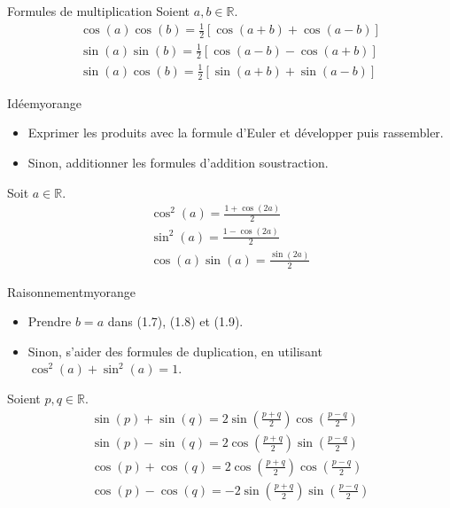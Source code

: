     \begin{coro}{Formules de multiplication}{}
        Soient $a,b \in \mathbb{R}$.
        \begin{align}
            \cos(a)\cos(b) = \frac{1}{2} \left[ \cos(a+b) + \cos(a-b) \right] \\
            \sin(a)\sin(b) = \frac{1}{2} \left[ \cos(a-b) - \cos(a+b) \right] \\
            \sin(a)\cos(b) = \frac{1}{2} \left[ \sin(a+b) + \sin(a-b) \right]
        \end{align}
    \end{coro}

    \begin{demo}{Idée}{myorange}
        \begin{itemize}[label=\textcolor{myorange}{$\star$}]
            \item Exprimer les produits avec la formule d’Euler et développer puis rassembler.
            \item Sinon, additionner les formules d’addition soustraction.
        \end{itemize}
    \end{demo}

    \begin{coro}{}{}
        Soit $a \in \mathbb{R}$.
        \begin{align}
            \cos^2(a) = \frac{1 + \cos(2a)}{2} \\
            \sin^2(a) = \frac{1 - \cos(2a)}{2} \\
            \cos(a)\sin(a) = \frac{\sin(2a)}{2}
        \end{align}
    \end{coro}
    
    \begin{demo}{Raisonnement}{myorange}
        \begin{itemize}[label=\textcolor{myorange}{$\star$}]
            \item Prendre $b = a$ dans (1.7), (1.8) et (1.9).
            \item Sinon, s’aider des formules de duplication, en utilisant $\cos^2(a) + \sin^2(a) = 1$.
        \end{itemize}
    \end{demo}

    \begin{prop}{}{}
        Soient $p,q \in \mathbb{R}$.
        \begin{align}
            \sin(p) + \sin(q) = 2\sin \left( \frac{p + q}{2} \right) \cos \left( \frac{p - q}{2} \right) \\
            \sin(p) - \sin(q) = 2\cos \left( \frac{p + q}{2} \right) \sin \left( \frac{p - q}{2} \right) \\
            \cos(p) + \cos(q) = 2\cos \left( \frac{p + q}{2} \right) \cos \left( \frac{p - q}{2} \right) \\
            \cos(p) - \cos(q) = -2\sin \left( \frac{p + q}{2} \right) \sin \left( \frac{p - q}{2} \right)
        \end{align}
    \end{prop}

